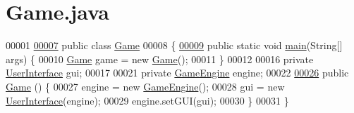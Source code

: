 \hypertarget{Game_8java_source}{\section{Game.\-java}
}

\begin{DoxyCode}
00001 
\hypertarget{Game_8java_source_l00007}{}\hyperlink{classGame}{00007} \textcolor{keyword}{public} \textcolor{keyword}{class }\hyperlink{classGame}{Game}
00008 \{
\hypertarget{Game_8java_source_l00009}{}\hyperlink{classGame_ae52595a27ac1b327b05db2129ad81fca}{00009}     \textcolor{keyword}{public} \textcolor{keyword}{static} \textcolor{keywordtype}{void} \hyperlink{classGame_ae52595a27ac1b327b05db2129ad81fca}{main}(String[] args) \{
00010         \hyperlink{classGame}{Game} game = \textcolor{keyword}{new} \hyperlink{classGame_a2e034e53e9c032964ecd2a831b29a616}{Game}();
00011     \}
00012 
00016     \textcolor{keyword}{private} \hyperlink{classUserInterface}{UserInterface} gui;
00017 
00021     \textcolor{keyword}{private} \hyperlink{classGameEngine}{GameEngine} engine;
00022 
\hypertarget{Game_8java_source_l00026}{}\hyperlink{classGame_a2e034e53e9c032964ecd2a831b29a616}{00026}     \textcolor{keyword}{public} \hyperlink{classGame_a2e034e53e9c032964ecd2a831b29a616}{Game} () \{
00027         engine = \textcolor{keyword}{new} \hyperlink{classGameEngine}{GameEngine}();
00028         gui = \textcolor{keyword}{new} \hyperlink{classUserInterface}{UserInterface}(engine);
00029         engine.setGUI(gui);
00030     \}
00031 \}
\end{DoxyCode}
